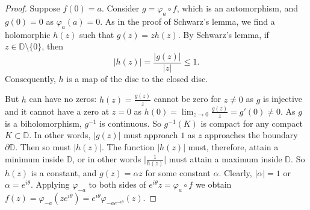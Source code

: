 \documentclass[12pt,openany]{book}
\newcommand{\sabs}[1]{\lvert {#1} \rvert}
\newcommand{\babs}[1]{\bigl\lvert {#1} \bigr\rvert}
\newcommand{\D}{{\mathbb{D}}}
\theoremstyle{plain}
\theoremstyle{remark}
\theoremstyle{definition}
\theoremstyle{exercise}
\theoremstyle{example}
\begin{document}
\begin{proof}
Suppose $f(0) = a$.
Consider $g = \varphi_a \circ f$, which is an automorphism,
and $g(0) = 0$ as
$\varphi_a(a) = 0$.
As in the proof of Schwarz's lemma, we find a holomorphic $h(z)$
such that $g(z) = z h(z)$.  By
Schwarz's lemma, if $z \in \D \setminus \{ 0 \}$, then
\begin{equation*}
\sabs{h(z)} = \frac{\sabs{g(z)}}{\sabs{z}} \leq 1 .
\end{equation*}
Consequently, $h$ is a map of the disc to the closed disc.

But $h$ can have no zeros:
$h(z) = \frac{g(z)}{z}$ cannot be zero for $z \not= 0$ as $g$ is injective
and it cannot have a zero at $z=0$
as $h(0) = \lim_{z\to 0} \frac{g(z)}{z} = g'(0) \not= 0$.  As $g$ is a biholomorphism, $g^{-1}$ is
continuous. So $g^{-1}(K)$ is compact for any compact $K \subset \D$.
In other words, $\sabs{g(z)}$ must approach $1$ as $z$
approaches the boundary $\partial \D$.
Then so must $\sabs{h(z)}$.
The function
$\sabs{h(z)}$ must, therefore, attain a minimum inside $\D$, or in other
words $\babs{\frac{1}{h(z)}}$ must attain a maximum inside $\D$.  So $h(z)$
is a constant, and $g(z) = \alpha z$ for some constant $\alpha$.
Clearly, 
$\sabs{\alpha} = 1$ or $\alpha = e^{i\theta}$.  Applying
$\varphi_{-a}$ to both sides of $e^{i\theta} z = \varphi_a \circ f$
we obtain
$f(z) = \varphi_{-a}(ze^{i\theta})
= e^{i \theta} \varphi_{-ae^{-i\theta}}(z)$.
\end{proof}
\end{document}
